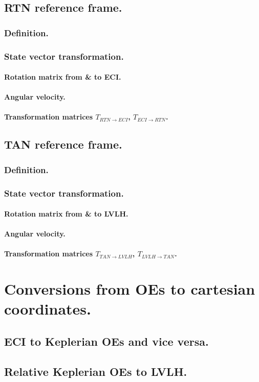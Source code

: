 	\subsection{RTN reference frame.}
		\subsubsection{Definition.}
		\subsubsection{State vector transformation.}
			\paragraph{Rotation matrix from \& to ECI. \\}
			\paragraph{Angular velocity. \\}
			\paragraph{Transformation matrices $T_{RTN\rightarrow ECI}$, $T_{ECI\rightarrow RTN}$. \\}
		
		
	\subsection{TAN reference frame.}
		\subsubsection{Definition.}
		\subsubsection{State vector transformation.}
			\paragraph{Rotation matrix from \& to LVLH. \\}
			\paragraph{Angular velocity. \\}
			\paragraph{Transformation matrices $T_{TAN\rightarrow LVLH}$, $T_{LVLH\rightarrow TAN}$. \\}
		
\section{Conversions from OEs to cartesian coordinates.}
%
%
	\subsection{ECI to Keplerian OEs and vice versa.}
	\subsection{Relative Keplerian OEs to LVLH.}
